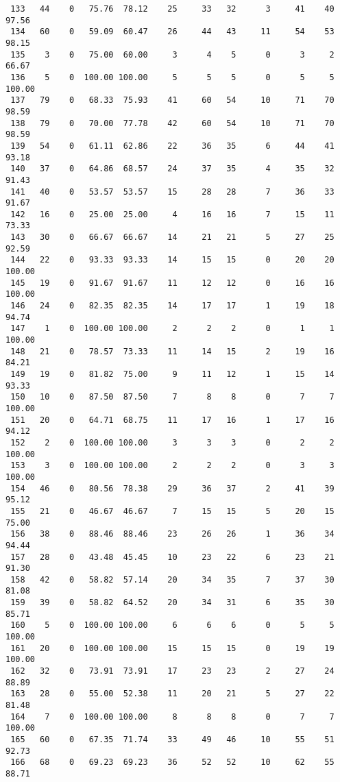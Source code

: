 \begin{verbatim}
 133   44    0   75.76  78.12    25     33   32      3     41    40    97.56
 134   60    0   59.09  60.47    26     44   43     11     54    53    98.15
 135    3    0   75.00  60.00     3      4    5      0      3     2    66.67
 136    5    0  100.00 100.00     5      5    5      0      5     5   100.00
 137   79    0   68.33  75.93    41     60   54     10     71    70    98.59
 138   79    0   70.00  77.78    42     60   54     10     71    70    98.59
 139   54    0   61.11  62.86    22     36   35      6     44    41    93.18
 140   37    0   64.86  68.57    24     37   35      4     35    32    91.43
 141   40    0   53.57  53.57    15     28   28      7     36    33    91.67
 142   16    0   25.00  25.00     4     16   16      7     15    11    73.33
 143   30    0   66.67  66.67    14     21   21      5     27    25    92.59
 144   22    0   93.33  93.33    14     15   15      0     20    20   100.00
 145   19    0   91.67  91.67    11     12   12      0     16    16   100.00
 146   24    0   82.35  82.35    14     17   17      1     19    18    94.74
 147    1    0  100.00 100.00     2      2    2      0      1     1   100.00
 148   21    0   78.57  73.33    11     14   15      2     19    16    84.21
 149   19    0   81.82  75.00     9     11   12      1     15    14    93.33
 150   10    0   87.50  87.50     7      8    8      0      7     7   100.00
 151   20    0   64.71  68.75    11     17   16      1     17    16    94.12
 152    2    0  100.00 100.00     3      3    3      0      2     2   100.00
 153    3    0  100.00 100.00     2      2    2      0      3     3   100.00
 154   46    0   80.56  78.38    29     36   37      2     41    39    95.12
 155   21    0   46.67  46.67     7     15   15      5     20    15    75.00
 156   38    0   88.46  88.46    23     26   26      1     36    34    94.44
 157   28    0   43.48  45.45    10     23   22      6     23    21    91.30
 158   42    0   58.82  57.14    20     34   35      7     37    30    81.08
 159   39    0   58.82  64.52    20     34   31      6     35    30    85.71
 160    5    0  100.00 100.00     6      6    6      0      5     5   100.00
 161   20    0  100.00 100.00    15     15   15      0     19    19   100.00
 162   32    0   73.91  73.91    17     23   23      2     27    24    88.89
 163   28    0   55.00  52.38    11     20   21      5     27    22    81.48
 164    7    0  100.00 100.00     8      8    8      0      7     7   100.00
 165   60    0   67.35  71.74    33     49   46     10     55    51    92.73
 166   68    0   69.23  69.23    36     52   52     10     62    55    88.71

\end{verbatim}
